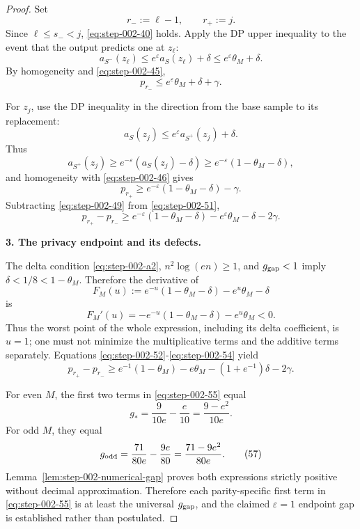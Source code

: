 \begin{proof}
Set
\[
r_-:=\ell-1,
\qquad
r_+:=j.
\tag{47}\label{eq:step-002-47}
\]
Since \(\ell\le s_-<j\), \eqref{eq:step-002-40} holds. Apply the DP upper inequality to the event that the output predicts one at \(z_\ell\):
\[
a_{S^-}(z_\ell)
\le e^\varepsilon a_S(z_\ell)+\delta
\le e^\varepsilon\theta_M+\delta.
\tag{48}\label{eq:step-002-48}
\]
By homogeneity and \eqref{eq:step-002-45},
\[
p_{r_-}\le e^\varepsilon\theta_M+\delta+\gamma.
\tag{49}\label{eq:step-002-49}
\]

For \(z_j\), use the DP inequality in the direction from the base sample to its replacement:
\[
a_S(z_j)\le e^\varepsilon a_{S^+}(z_j)+\delta.
\]
Thus
\[
a_{S^+}(z_j)
\ge e^{-\varepsilon}(a_S(z_j)-\delta)
\ge e^{-\varepsilon}(1-\theta_M-\delta),
\tag{50}\label{eq:step-002-50}
\]
and homogeneity with \eqref{eq:step-002-46} gives
\[
p_{r_+}
\ge e^{-\varepsilon}(1-\theta_M-\delta)-\gamma.
\tag{51}\label{eq:step-002-51}
\]
Subtracting \eqref{eq:step-002-49} from \eqref{eq:step-002-51},
\[
p_{r_+}-p_{r_-}
\ge
e^{-\varepsilon}(1-\theta_M-\delta)
-e^\varepsilon\theta_M-\delta-2\gamma.
\tag{52}\label{eq:step-002-52}
\]

\textbf{3. The privacy endpoint and its defects.}

The delta condition \eqref{eq:step-002-a2}, \(n^2 \log(en)\ge 1\), and \(g_{\rm gap}<1\) imply \(\delta<1/8<1-\theta_M\). Therefore the derivative of
\[
F_M(u):=e^{-u}(1-\theta_M-\delta)-e^u\theta_M-\delta
\tag{53}\label{eq:step-002-53}
\]
is
\[
F_M'(u)
=-e^{-u}(1-\theta_M-\delta)-e^u\theta_M<0.
\tag{54}\label{eq:step-002-54}
\]
Thus the worst point of the whole expression, including its delta coefficient, is \(u=1\); one must not minimize the multiplicative terms and the additive terms separately. Equations \eqref{eq:step-002-52}-\eqref{eq:step-002-54} yield
\[
p_{r_+}-p_{r_-}
\ge
e^{-1}(1-\theta_M)-e\theta_M
-(1+e^{-1})\delta-2\gamma.
\tag{55}\label{eq:step-002-55}
\]

For even \(M\), the first two terms in \eqref{eq:step-002-55} equal
\[
g_* = \frac9{10e}-\frac e{10}
=\frac{9-e^2}{10e}.
\tag{56}\label{eq:step-002-56}
\]
For odd \(M\), they equal
\[
g_{\rm odd}
=\frac{71}{80e}-\frac{9e}{80}
=\frac{71-9e^2}{80e}.
\tag{57}\label{eq:step-002-57}
\]
Lemma~\ref{lem:step-002-numerical-gap} proves both expressions strictly positive without decimal approximation. Therefore each parity-specific first term in \eqref{eq:step-002-55} is at least the universal \(g_{\rm gap}\), and the claimed \(\varepsilon=1\) endpoint gap is established rather than postulated.


\end{proof}
